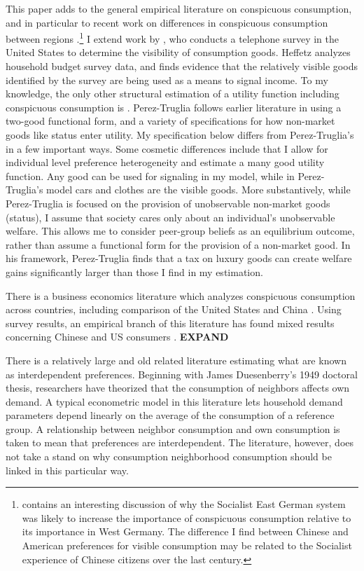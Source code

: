 \documentclass[11pt]{article}
\begin{document}
\begin{CJK}{UTF8}{gbsn}
This paper adds to the general empirical literature on conspicuous consumption,\citep{Blochetal2004,Charlesetal2009,MoavNeeman2010,MoavNeeman2012} and in particular to recent work on differences in conspicuous consumption between regions \citep{friehe2014conspicuous}.\footnote{ \citet{friehe2014conspicuous} contains an interesting discussion of why the Socialist East German system was likely to increase the importance of conspicuous consumption relative to its importance in West Germany.  The difference I find between Chinese and American preferences for visible consumption may be related to the Socialist experience of Chinese citizens over the last century.} I extend work by \citet{heffetz2011}, who conducts a telephone survey in the United States to determine the visibility of consumption goods.  Heffetz analyzes household budget survey data, and finds evidence that the relatively visible goods identified by the survey are being used as a means to signal income.  To my knowledge, the only other structural estimation of a utility function including conspicuous consumption is \citet{perez2013measuring}.  Perez-Truglia follows earlier literature in using a two-good functional form, and a variety of specifications for how non-market goods like status enter utility.  My specification below differs from Perez-Truglia's in a few important ways.  Some cosmetic differences include that I allow for individual level preference heterogeneity and estimate a many good utility function.  Any good can be used for signaling in my model, while in Perez-Truglia's model cars and clothes are the visible goods.  More substantively, while Perez-Truglia is focused on the provision of unobservable non-market goods (status), I assume that society cares only about an individual's unobservable welfare.  This allows me to consider peer-group beliefs as an equilibrium outcome, rather than assume a functional form for the provision of a non-market good.  In his framework, Perez-Truglia finds that a tax on luxury goods can create welfare gains significantly larger than those I find in my estimation.

There is a business economics literature which analyzes conspicuous consumption across countries, including comparison of the United States and China \citep{wong1998personal}.  Using survey results, an empirical branch of this literature has found mixed results concerning Chinese and US consumers \citep{podoshen2011materialism}. \textbf{EXPAND}

There is a relatively large and old related literature estimating what are known as interdependent preferences.  Beginning with James Duesenberry's 1949 doctoral thesis,\citep{Duesenberry1949} researchers have theorized that the consumption of neighbors affects own demand.  A typical econometric model in this literature lets household demand parameters depend linearly on the average of the consumption of a reference group. A relationship between neighbor consumption and own consumption is taken to mean that preferences are interdependent.  The literature, however, does not take a stand on why consumption neighborhood consumption should be linked in this particular way.



\end{CJK}
\end{document}
